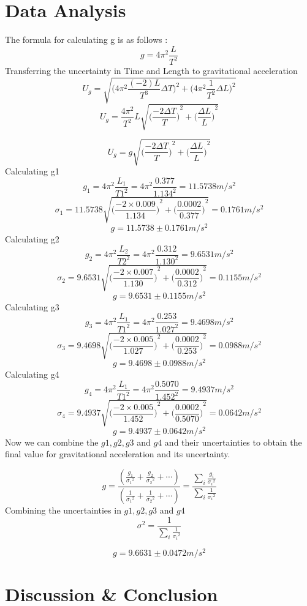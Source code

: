 \section{Data Analysis}
The formula for calculating g is as follows :
$$ g = 4\pi^2\frac{L}{T^2} $$
Transferring the uncertainty in Time and Length to gravitational acceleration
$$ U_g = \sqrt{\Bigg({4\pi^2 \frac{(-2)L}{T^3} \Delta T}\Bigg)^2+\Bigg({4\pi^2 \frac{1}{T^2} \Delta L}\Bigg)^2}$$
$$ U_g = \frac{4\pi^2}{T^2} L \sqrt{ {\bigg( \frac{-2 \Delta T}{T}  \bigg)}^2    +  {\bigg( \frac{\Delta L}{L} \bigg)}^2} $$

$$ U_g = g\sqrt{ {\bigg( \frac{-2 \Delta T}{T}  \bigg)}^2    +  {\bigg( \frac{\Delta L}{L} \bigg)}^2} $$
Calculating g1 
$$ g_1 = 4\pi^2 \frac{L_1}{{T1}^2} = 4\pi^2 \frac{0.377}{{1.134}^2}  = 11.5738  m/s^2 $$ 
$$ \sigma_1 = 11.5738 \sqrt{{\bigg(\frac{-2 \times 0.009}{1.134}\bigg)}^2+{\bigg(\frac{0.0002}{0.377}\bigg)}^2} = 0.1761  m/s^2 $$
$$ g = 11.5738 \pm 0.1761 m/s^2 $$
Calculating g2
$$ g_2 = 4\pi^2\frac{L_2}{{T2}^2} = 4\pi^2 \frac{0.312}{1.130^2}  = 9.6531  m/s^2  $$ 
$$ \sigma_2 = 9.6531 \sqrt{{\bigg(\frac{-2 \times 0.007}{1.130}  \bigg)}^2+{\bigg( \frac{0.0002}{0.312} \bigg)}^2} = 0.1155 m/s^2 $$
$$ g = 9.6531 \pm 0.1155 m/s^2$$
Calculating g3
$$ g_3 = 4\pi^2\frac{L_1}{{T1}^2} = 4\pi^2 \frac{0.253}{{1.027}^2}  = 9.4698 m/s^2$$ 
$$ \sigma_3 = 9.4698 \sqrt{{\bigg( \frac{-2 \times 0.005}{1.027} \bigg)}^2+{\bigg( \frac{0.0002}{0.253} \bigg)}^2} = 0.0988  m/s^2 $$
$$ g = 9.4698 \pm 0.0988 m/s^2 $$
Calculating g4
$$ g_4 = 4\pi^2\frac{L_1}{{T1}^2} = 4\pi^2 \frac{0.5070}{1.452^2}  = 9.4937  m/s^2 $$ 
$$ \sigma_4 = 9.4937 \sqrt{ {\bigg( \frac{-2 \times 0.005}{1.452}  \bigg)}^2    +  {\bigg( \frac{0.0002}{0.5070} \bigg)}^2} = 0.0642 m/s^2$$
$$ g = 9.4937 \pm 0.0642 m/s^2$$
Now we can combine the $g1,g2,g3$ and $g4$ and their uncertainties to obtain the final value for gravitational acceleration and its uncertainty.

$$ g = \frac{ (\frac{g_1}{{\sigma_1}^2}+\frac{g_2}{{\sigma_2}^2}+\cdots)} {(\frac{1}{{\sigma_1}^2}+\frac{1}{{\sigma_2}^2}+\cdots)} = \frac{\sum_{i} \frac{g_i}{{\sigma_i}^2} }{\sum_{i} \frac{1}{{\sigma_i}^2} }$$
Combining the uncertainties in $g1,g2,g3$ and $g4$
$$ \sigma^2 =  \frac{1}{\sum_{i} \frac{1}{{\sigma_i}^2} }$$

$$ g = 9.6631  \pm 0.0472 m/s^2$$





\section{Discussion \& Conclusion}

